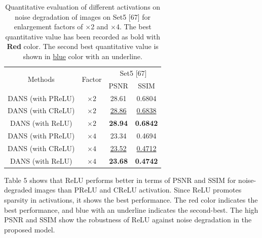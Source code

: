 \documentclass{ieeeaccess}
\begin{document}
\begin{table} 
\centering
\caption{Quantitative evaluation of different activations on noise degradation of images on Set5 [67] for enlargement factors of $\times$2 and $\times$4. The best quantitative value has been recorded as bold with {\color{red}\textbf{Red }} color. The second best quantitative value is shown in {\color{blue}\underline{blue}} color with an underline.}

\label{table5}
\setlength{\tabcolsep}{3 pt}
\begin{tabular}{|c|c|cc|}
\hline
\multirow{2}{*}{Methods} & \multirow{2}{*}{Factor} & \multicolumn{2}{c|}{Set5 [67]}  \\

\cline{3-4}&& \multicolumn{1}{c|}{PSNR}  & SSIM        \\

\hline

DANS (with PReLU) &$\times2$ &\multicolumn {1}{c|}{28.61 } & 0.6804  \\

DANS (with CReLU) &$\times2$ &\multicolumn {1}{c|}{\color{blue}\underline{28.86}} & {\color{blue}\underline{0.6838}}  \\

DANS (with ReLU) &$\times2$ &\multicolumn {1}{c|}{\color{red}\textbf{28.94}} & {\color{red}\textbf{0.6842}}  \\

\hline

DANS (with PReLU) &$\times4$ &\multicolumn {1}{c|}{23.34 } & 0.4694  \\

DANS (with CReLU) &$\times4$ &\multicolumn {1}{c|}{\color{blue}\underline{23.52}} & {\color{blue}\underline{0.4712}}  \\

DANS (with ReLU) &$\times4$ &\multicolumn {1}{c|}{\color{red}\textbf{23.68}} & {\color{red}\textbf{0.4742}}  \\

\hline

\end{tabular}
\end{table}

Table 5 shows that ReLU performs better in terms of PSNR and SSIM for noise-degraded images than PReLU and CReLU activation. Since ReLU promotes sparsity in activations, it shows the best performance. The red color indicates the best performance, and blue with an underline indicates the second-best. The high PSNR and SSIM show the robustness of ReLU against noise degradation in the proposed model. 
\end{document}
